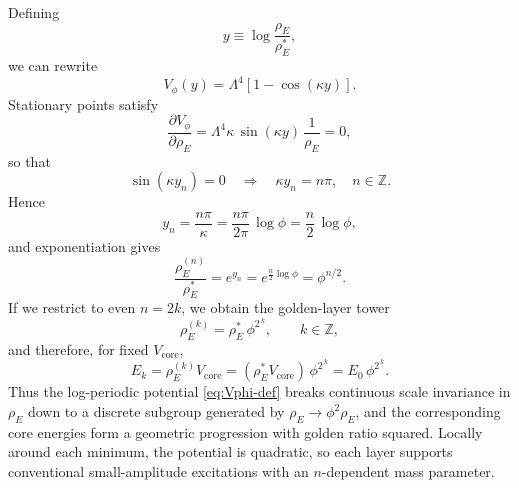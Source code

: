 \documentclass[10pt,reprint,aps,onecolumn,nofootinbib]{revtex4-2}
\newcommand{\rhoE}{\rho_{\!E}}                           %
\newcommand{\Golden}{\phi}
\newcommand{\GoldenSq}{\phi^{2}}
\begin{document}
    Defining
    \begin{equation}
        y \equiv \log\frac{\rhoE}{\rhoE^{*}},
    \end{equation}
    we can rewrite
    \begin{equation}
        V_{\Golden}(y)
        = \Lambda^4\left[1 - \cos(\kappa y)\right].
    \end{equation}
    Stationary points satisfy
    \begin{equation}
        \frac{\partial V_{\Golden}}{\partial \rhoE}
        = \Lambda^4 \kappa \,\sin(\kappa y)\,\frac{1}{\rhoE}
        = 0,
    \end{equation}
    so that
    \begin{equation}
        \sin(\kappa y_n) = 0
        \quad\Longrightarrow\quad
        \kappa y_n = n\pi,\quad n\in\mathbb{Z}.
    \end{equation}
    Hence
    \begin{equation}
        y_n = \frac{n\pi}{\kappa}
        = \frac{n\pi}{2\pi}\,\log\Golden
        = \frac{n}{2}\,\log\Golden,
    \end{equation}
    and exponentiation gives
    \begin{equation}
        \frac{\rhoE^{(n)}}{\rhoE^{*}}
        = e^{y_n} = e^{\frac{n}{2}\log\Golden}
        = \Golden^{n/2}.
    \end{equation}
    If we restrict to even $n = 2k$, we obtain the golden-layer tower
    \begin{equation}
        \rhoE^{(k)} = \rhoE^{*}\,\GoldenSq^{\,k},
        \qquad
        k \in \mathbb{Z},
        \label{eq:golden-layers-rhoE}
    \end{equation}
    and therefore, for fixed $V_{\text{core}}$,
    \begin{equation}
        E_k = \rhoE^{(k)} V_{\text{core}}
        = (\rhoE^{*} V_{\text{core}})\,\GoldenSq^{\,k}
        = E_0\,\GoldenSq^{\,k}.
    \end{equation}
    Thus the log-periodic potential \eqref{eq:Vphi-def} breaks continuous
    scale invariance in $\rhoE$ down to a discrete subgroup generated by
    $\rhoE \rightarrow \GoldenSq \rhoE$, and the corresponding core
    energies form a geometric progression with golden ratio squared.
    Locally around each minimum, the potential is quadratic, so each layer
    supports conventional small-amplitude excitations with an $n$-dependent
    mass parameter.


\end{document}

